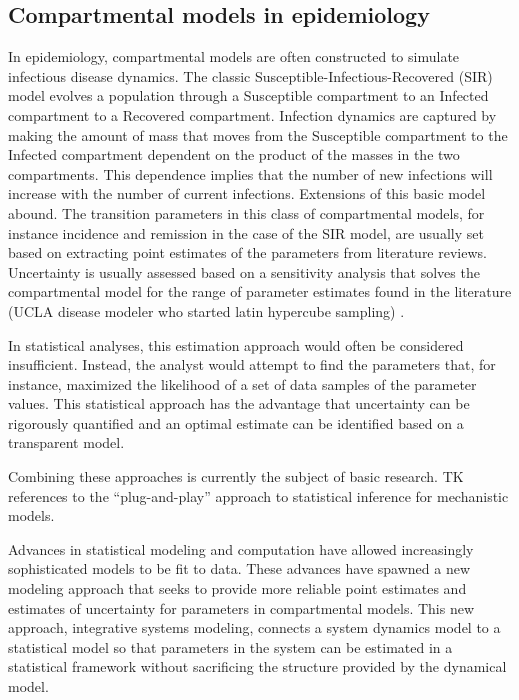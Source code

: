 \subsection{Compartmental models in epidemiology}
In epidemiology, compartmental models are often constructed to
simulate infectious disease dynamics.\cite{Anderson_Infectious_1991}
The classic Susceptible-Infectious-Recovered (SIR) model evolves a
population through a Susceptible compartment to an Infected
compartment to a Recovered
compartment.\cite{Kermack_Contribution_1927} Infection dynamics are
captured by making the amount of mass that moves from the Susceptible
compartment to the Infected compartment dependent on the product of
the masses in the two compartments. This dependence implies that the
number of new infections will increase with the number of current
infections. Extensions of this basic model abound.\cite{Daley_Epidemic_2001,Brauer_Mathematical_2001} The transition
parameters in this class of compartmental models, for instance incidence and
remission in the case of the SIR model, are usually set
based on extracting point estimates of the parameters from literature
reviews. Uncertainty is usually assessed based on a sensitivity
analysis that solves the compartmental model for the range of
parameter estimates found in the literature (UCLA disease modeler who
started latin hypercube sampling) \cite{Nagelkerke_Modelling_2002,
  Brandeau_Screening_1993, Broutin_Impact_2010}.

In statistical analyses, this estimation approach would often be
considered insufficient. Instead, the analyst would attempt to find the
parameters that, for instance, maximized the likelihood of a set of
data samples of the parameter values. This statistical approach has
the advantage that uncertainty can be rigorously quantified and an
optimal estimate can be identified based on a transparent model.

Combining these approaches is currently the subject of basic research.
TK references to the ``plug-and-play'' approach to statistical
inference for mechanistic models.

Advances in statistical modeling and computation have allowed
increasingly sophisticated models to be fit to data. These advances
have spawned a new modeling approach that seeks to provide more
reliable point estimates and estimates of uncertainty for parameters
in compartmental models. This new approach, integrative systems
modeling, connects a system dynamics model to a statistical model so
that parameters in the system can be estimated in a statistical
framework without sacrificing the structure provided by the dynamical
model.

